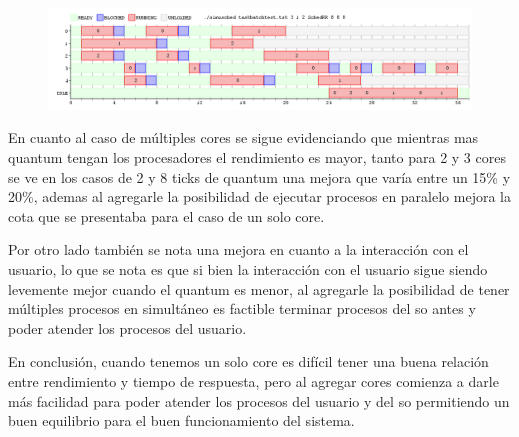 \begin{figure}[H]
  \centering
\includegraphics[scale=0.45]{graficos/ejercicio7/3testTask1.png}
  \caption[Task Batch con un nucleo y  quantum 8]{}
\end{figure}
En cuanto al caso de múltiples cores se sigue evidenciando que mientras mas quantum tengan los procesadores el rendimiento es mayor, tanto para 2 y 3 cores se ve en los casos de 2 y 8 ticks de quantum una mejora que varía entre un 15\% y 20\%, ademas al agregarle la posibilidad de ejecutar procesos en paralelo mejora la cota que se presentaba para el caso de un solo core.

Por otro lado también se nota una mejora en cuanto a la interacción con el usuario, lo que se nota es que si bien la interacción con el usuario sigue siendo levemente mejor cuando el quantum es menor, al agregarle la posibilidad de tener múltiples procesos en simultáneo es factible terminar procesos del so antes y poder atender los procesos del usuario.

En conclusión, cuando tenemos un solo core es difícil tener una buena relación entre rendimiento y tiempo de respuesta, pero al agregar cores comienza a darle más facilidad para poder atender los procesos del usuario y del so permitiendo un buen equilibrio para el buen funcionamiento del sistema.
